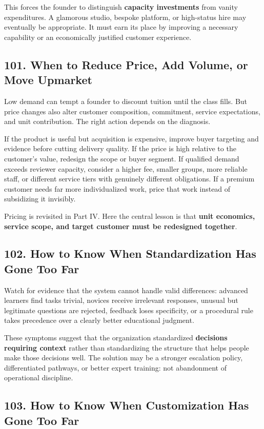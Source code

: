 This forces the founder to distinguish \textbf{capacity investments} from vanity expenditures. A glamorous studio, bespoke platform, or high-status hire may eventually be appropriate. It must earn its place by improving a necessary capability or an economically justified customer experience.

\subsection*{101. When to Reduce Price, Add Volume, or Move Upmarket}

Low demand can tempt a founder to discount tuition until the class fills. But price changes also alter customer composition, commitment, service expectations, and unit contribution. The right action depends on the diagnosis.

If the product is useful but acquisition is expensive, improve buyer targeting and evidence before cutting delivery quality. If the price is high relative to the customer's value, redesign the scope or buyer segment. If qualified demand exceeds reviewer capacity, consider a higher fee, smaller groups, more reliable staff, or different service tiers with genuinely different obligations. If a premium customer needs far more individualized work, price that work instead of subsidizing it invisibly.

Pricing is revisited in Part IV. Here the central lesson is that \textbf{unit economics, service scope, and target customer must be redesigned together}.

\subsection*{102. How to Know When Standardization Has Gone Too Far}

Watch for evidence that the system cannot handle valid differences: advanced learners find tasks trivial, novices receive irrelevant responses, unusual but legitimate questions are rejected, feedback loses specificity, or a procedural rule takes precedence over a clearly better educational judgment.

These symptoms suggest that the organization standardized \textbf{decisions requiring context} rather than standardizing the structure that helps people make those decisions well. The solution may be a stronger escalation policy, differentiated pathways, or better expert training: not abandonment of operational discipline.

\subsection*{103. How to Know When Customization Has Gone Too Far}

